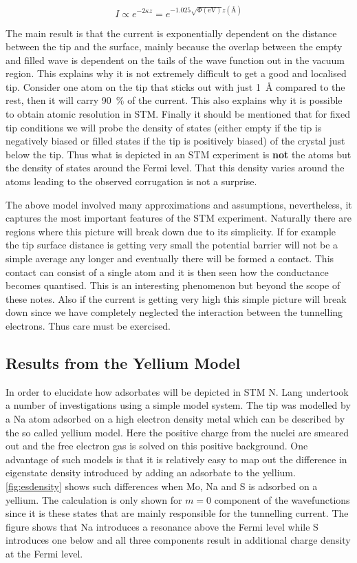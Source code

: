 \begin{equation}
I\propto e^{-2\kappa z}=e^{-1.025\sqrt{\Phi(\si{\electronvolt})}z(\si{\angstrom})}
\end{equation}

The main result is that the current is exponentially dependent on the distance between the tip and the surface, mainly because the overlap between the empty and filled wave is dependent on the tails of the wave function out in the vacuum region. This explains why it is not extremely difficult to get a good and localised tip. Consider one atom on the tip that sticks out with just \SI{1}{\angstrom} compared to the rest, then it will carry \SI{90}{\percent} of the current. This also explains why it is possible to obtain atomic resolution in STM. Finally it should be mentioned that for  fixed tip conditions we will probe the density of states (either empty if the tip is negatively biased or filled states if the tip is positively biased) of the crystal just below the tip. Thus what is depicted in an STM experiment is {\bf not} the atoms but the density of states around the Fermi level. That this density varies around the atoms leading to the observed corrugation is not a surprise.

The above model involved many approximations and assumptions, nevertheless, it captures the most important features of the STM experiment. Naturally there are regions where this picture will break down due to its simplicity. If for example the tip surface distance is getting very small the potential barrier will not be a simple average any longer and eventually there will be formed a contact. This contact can consist of a single atom and it is then seen how the conductance becomes quantised. This is an interesting phenomenon but beyond the scope of these notes. Also if the current is getting very high this simple picture will break down since we have completely neglected the interaction between the tunnelling electrons. Thus care must be exercised.

\subsection{Results from the Yellium Model}
In order to elucidate how adsorbates will be depicted in STM N. Lang \cite{Lang} undertook a number of investigations using  a simple model system. The tip was modelled by a Na atom adsorbed on a high electron density metal which can be described by the so called yellium model. Here the positive charge from the nuclei are smeared out and the free electron gas is solved on this positive background. One advantage of such models is that it is relatively easy to map out the difference in eigenstate density introduced by adding an adsorbate to the yellium. \autoref{fig:esdensity} shows such differences when Mo, Na and S is adsorbed on a yellium. The calculation is only shown for $m=0$ component of the wavefunctions since it is these states that are mainly  responsible for  the tunnelling current. The figure shows that Na introduces a resonance above the Fermi level while S introduces one below and all three components result in additional charge density at the Fermi level.

